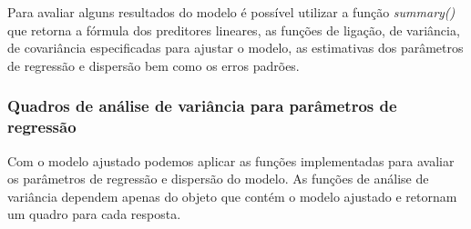 \begin{knitrout}
\color{fgcolor}\begin{kframe}
\begin{alltt}
 \hlkwb{<-} \hlstd{(} \hlstd{=} 
                    \hlstd{=} \hlstd{(}
                    \hlstd{=} \hlstd{(}\hlstd{,}
                            \hlstd{,}
                            \hlstd{),}
                    \hlstd{=} \hlstd{(}\hlstd{,}
                                \hlstd{,}
                                \hlstd{),}
                    \hlstd{=} \hlstd{(}\hlstd{,}
                                 \hlstd{,}
                                 \hlopt{$}
                    \hlstd{=} 
                    
\end{alltt}
\end{kframe}
\end{knitrout}


Para avaliar alguns resultados do modelo é possível utilizar a função \emph{summary()} que retorna a fórmula dos preditores lineares, as funções de ligação, de variância, de covariância especificadas para ajustar o modelo, as estimativas dos parâmetros de regressão e dispersão bem como os erros padrões.

\subsubsection{Quadros de análise de variância para parâmetros de regressão}

Com o modelo ajustado podemos aplicar as funções implementadas para avaliar os parâmetros de regressão e dispersão do modelo. As funções de análise de variância dependem apenas do objeto que contém o modelo ajustado e retornam um quadro para cada resposta.


